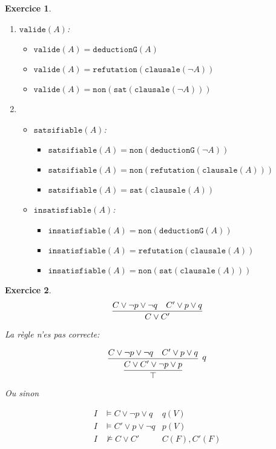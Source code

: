 \documentclass{article}
\theoremstyle{plain}
\newtheorem{exo}{Exercice}%
\begin{document}
\begin{exo}
\begin{enumerate}
    \item $\texttt{valide}(A)$:
    \begin{itemize}
        \item $\texttt{valide}(A) = \texttt{deductionG}(A)$
        \item $\texttt{valide}(A) = \texttt{refutation}(
          \texttt{clausale}(\neg A))$
        \item $\texttt{valide}(A) = \texttt{non}(\texttt{sat}(
          \texttt{clausale}(\neg A)))$
    \end{itemize}

    \item \begin{itemize}
        \item $\texttt{satsifiable}(A)$:
        \begin{itemize}
            \item $\texttt{satsifiable}(A) = \texttt{non}(
                \texttt{deductionG}(\neg A))$
            \item $\texttt{satsifiable}(A) = \texttt{non}(
                    \texttt{refutation}(\texttt{clausale}(A)))$

            \item $\texttt{satsifiable}(A) = \texttt{sat}(
                \texttt{clausale}(A))$
        \end{itemize}

        \item $\texttt{insatisfiable}(A)$:
        \begin{itemize}
            \item $\texttt{insatisfiable}(A) = \texttt{non}(\texttt{deductionG}(A))$
            \item $\texttt{insatisfiable}(A) = \texttt{refutation}(\texttt{clausale}(A))$
            \item $\texttt{insatisfiable}(A) = \texttt{non}(
                \texttt{sat}(\texttt{clausale}(A)))$
        \end{itemize}
    \end{itemize}
\end{enumerate}
\end{exo}

\begin{exo}
    \[
        \infer{C \vee C'}{C \vee \neg p \vee \neg q & C' \vee p \vee q}
    \]

    La règle n'es pas correcte:

    \[
        \infer[]{\top}
        {   \infer[q]{C \vee C' \vee \neg p \vee p}
            {C \vee \neg p \vee \neg q & C' \vee p \vee q}
        }
    \]

    Ou sinon

    \begin{align*}
        I &\models C \vee \neg p \vee q & q(V)\\
        I &\models C' \vee p \vee \neg q & p(V)\\
        I &\not\models C \vee C' & C(F), C'(F)\\
    \end{align*}
\end{exo}
\end{document}
